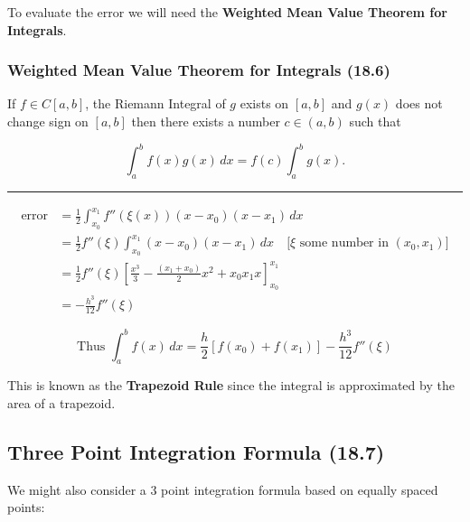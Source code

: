 \documentclass[12pt]{article}
\begin{document}
To evaluate the error we will need the \textbf{Weighted Mean Value Theorem for
Integrals}.

\subsubsection{Weighted Mean Value Theorem for Integrals (18.6)}\label{sec:weighted_mean_value_theorem}

If $f\in C[a,b]$, the Riemann Integral of $g$ exists on $[a,b]$ and $g(x)$ does
not change sign on $[a,b]$ then there exists a number $c \in (a,b)$ such that

\[
  \int_a^b f(x) g(x) \, dx = f(c) \int_a^b g(x) 
.\]

\hrule

\begin{align*}
  \text{error} &= \frac{1}{2}\int_{x_0}^{x_1} f''\left(\xi(x)\right)(x - x_0)(x - x_1)\,dx \\
               &= \frac{1}{2} f''(\xi)\int_{x_0}^{x_1}(x - x_0)(x - x_1)\,dx \quad\text{[$\xi$ some number in $(x_0,x_1)$]}\\[6pt]
               &= \frac{1}{2}f''(\xi)\left[\frac{x^3}{3}-\frac{(x_1 + x_0)}{2}x^2+x_0x_1 x\right]_{x_0}^{x_1}\\[6pt]
               &= -\frac{h^3}{12}f''(\xi)
\end{align*}


\[
  \text{Thus } \boxed{
    \int_a^b f(x) \, dx = \frac{h}{2} \left[f(x_0) + f(x_1)\right] -
    \frac{h^3}{12} f''(\xi)
  }
\]

This is known as the \textbf{Trapezoid Rule} since the integral is approximated
by the area of a trapezoid.

\subsection{Three Point Integration Formula (18.7)}\label{sec:three_point_integration}
We might also consider a 3 point integration formula based on equally spaced
points:
\end{document}
